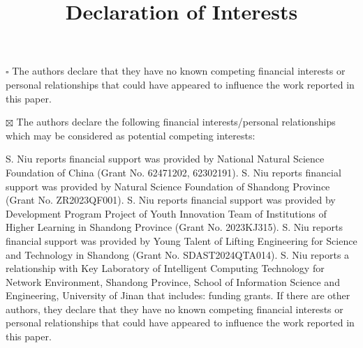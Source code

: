 \documentclass[12pt]{article}
\begin{document}
\title{\textbf{Declaration of Interests}}
\date{}
\maketitle

$\square$ The authors declare that they have no known competing financial interests or personal relationships that could have appeared to influence the work reported in this paper.

$\boxtimes$ The authors declare the following financial interests/personal relationships which may be considered as potential competing interests:

S. Niu reports financial support was provided by National Natural Science Foundation of China (Grant No. 62471202, 62302191). S. Niu reports financial support was provided by Natural Science Foundation of Shandong Province (Grant No. ZR2023QF001). S. Niu reports financial support was provided by Development Program Project of Youth Innovation Team of Institutions of Higher Learning in Shandong Province (Grant No. 2023KJ315). S. Niu reports financial support was provided by Young Talent of Lifting Engineering for Science and Technology in Shandong (Grant No. SDAST2024QTA014). S. Niu reports a relationship with Key Laboratory of Intelligent Computing Technology for Network Environment, Shandong Province, School of Information Science and Engineering, University of Jinan that includes: funding grants. If there are other authors, they declare that they have no known competing financial interests or personal relationships that could have appeared to influence the work reported in this paper.
\end{document}
